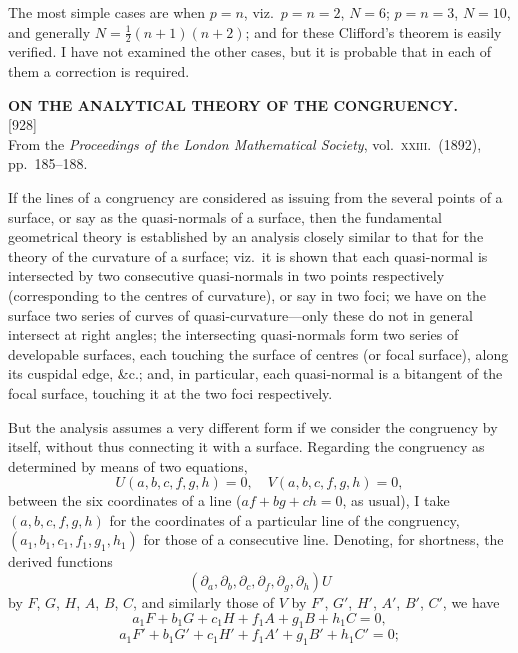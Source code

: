 \documentclass[11pt,a4paper]{article}
\newcommand{\paper}[3]{%
  \clearpage
  \begin{center}
    {\large\bfseries #2}\\[0.5em]
    {\small [#1]}\\[0.3em]
    {\small #3}
  \end{center}
  \vspace{0.5em}
}
\begin{document}
The most simple cases are when $p = n$, viz.\ $p = n = 2$, $N = 6$; $p = n = 3$, $N = 10$, and generally $N = \tfrac{1}{2}(n + 1)(n + 2)$; and for these Clifford's theorem is easily verified. I have not examined the other cases, but it is probable that in each of them a correction is required.

\paper{928}{ON THE ANALYTICAL THEORY OF THE CONGRUENCY.}{From the \textit{Proceedings of the London Mathematical Society}, vol.\ \textsc{xxiii}.\ (1892), pp.\ 185--188.}

If the lines of a congruency are considered as issuing from the several points of a surface, or say as the quasi-normals of a surface, then the fundamental geometrical theory is established by an analysis closely similar to that for the theory of the curvature of a surface; viz.\ it is shown that each quasi-normal is intersected by two consecutive quasi-normals in two points respectively (corresponding to the centres of curvature), or say in two foci; we have on the surface two series of curves of quasi-curvature---only these do not in general intersect at right angles; the intersecting quasi-normals form two series of developable surfaces, each touching the surface of centres (or focal surface), along its cuspidal edge, \&c.; and, in particular, each quasi-normal is a bitangent of the focal surface, touching it at the two foci respectively.

But the analysis assumes a very different form if we consider the congruency by itself, without thus connecting it with a surface. Regarding the congruency as determined by means of two equations,
\[
U(a, b, c, f, g, h) = 0,\quad V(a, b, c, f, g, h) = 0,
\]
between the six coordinates of a line ($af + bg + ch = 0$, as usual), I take $(a, b, c, f, g, h)$ for the coordinates of a particular line of the congruency, $(a_1, b_1, c_1, f_1, g_1, h_1)$ for those of a consecutive line. Denoting, for shortness, the derived functions
\[
(\partial_a, \partial_b, \partial_c, \partial_f, \partial_g, \partial_h) U
\]
by $F$, $G$, $H$, $A$, $B$, $C$, and similarly those of $V$ by $F'$, $G'$, $H'$, $A'$, $B'$, $C'$, we have
\[
a_1 F + b_1 G + c_1 H + f_1 A + g_1 B + h_1 C = 0,
\]
\[
a_1 F' + b_1 G' + c_1 H' + f_1 A' + g_1 B' + h_1 C' = 0;
\]
\end{document}
